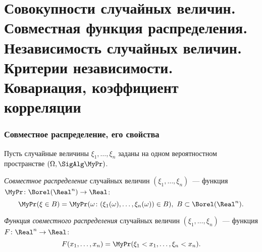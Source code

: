 \section{Совокупности случайных величин. Совместная функция распределения. Независимость случайных величин. Критерии независимости. Ковариация, коэффициент корреляции}

\subsubsection{Совместное распределение, его свойства}

Пусть случайные величины $\xi_1, \ldots, \xi_n$ заданы на одном вероятностном пространстве $(\Omega, \SigAlg \MyPr)$.
\begin{defn}
    \textit{Совместное распределение} случайных величин $(\xi_1, \ldots, \xi_n)$~--- функция $\MyPr\colon \Borel(\Real^{n}) \to \Real$:
    \begin{equation*}
        \MyPr(\xi \in B) = \MyPr(\omega \colon (\xi_{1}(\omega), \ldots, \xi_{n}(\omega)) \in B),~ B \subset \Borel(\Real^{n}).
    \end{equation*}
\end{defn}
\begin{defn}
    \textit{Функция совместного распределения} случайных величин $(\xi_1, \ldots, \xi_n)$~--- функция $F\colon \Real^{n} \to \Real$:
    \begin{equation*}
        F(x_{1}, \ldots, x_{n})=\MyPr(\xi_{1}<x_{1}, \ldots, \xi_{n}<x_{n}).
    \end{equation*}
\end{defn}

